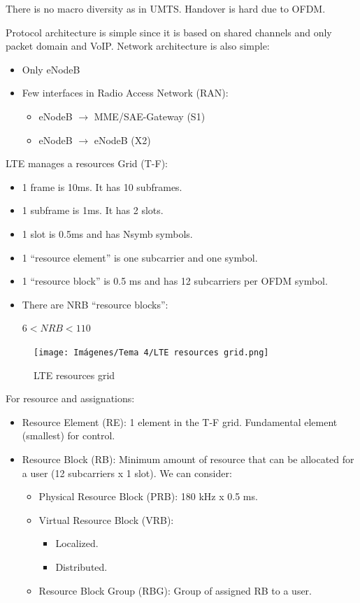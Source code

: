 \documentclass[
	12pt,
	twoside
]{book}
\begin{document}
There is no macro diversity as in UMTS. Handover is hard due to OFDM.

Protocol architecture is simple since it is based on shared channels and only packet domain and VoIP. Network architecture is also simple:
\begin{itemize}
	\item Only eNodeB
	\item {
		Few interfaces in Radio Access Network (RAN):
		\begin{itemize}
			\item eNodeB $\rightarrow$ MME/SAE-Gateway (S1)
			\item eNodeB $\rightarrow$ eNodeB (X2)
		\end{itemize}
	}
\end{itemize}

LTE manages a resources Grid (T-F):
\begin{itemize}
	\item 1 frame is 10ms. It has 10 subframes.
	\item 1 subframe is 1ms. It has 2 slots.
	\item 1 slot is 0.5ms and has Nsymb symbols.
	\item 1 ``resource element'' is one subcarrier and one symbol.
	\item 1 ``resource block'' is 0.5 ms and has 12 subcarriers per OFDM symbol.
	\item {
		There are NRB ``resource blocks'':

		$6 < NRB < 110$
	}
\end{itemize}

\begin{figure}[H]
	\centering
	\texttt{[image: Imágenes/Tema 4/LTE resources grid.png]}
	\caption{
		\label{fig:unit4_LTE_resources_grid}
		LTE resources grid
	}
\end{figure}

For resource and assignations:
\begin{itemize}
	\item Resource Element (RE): 1 element in the T-F grid. Fundamental element (smallest) for control.
	\item {
		Resource Block (RB): Minimum amount of resource that can be allocated for a user (12 subcarriers x 1 slot). We can consider:
		\begin{itemize}
			\item Physical Resource Block (PRB): 180 kHz x 0.5 ms.
			\item {
				Virtual Resource Block (VRB):
				\begin{itemize}
					\item Localized.
					\item Distributed.
				\end{itemize}
			}
			\item Resource Block Group (RBG): Group of assigned RB to a user.
		\end{itemize}
	}
\end{itemize}
\end{document}
